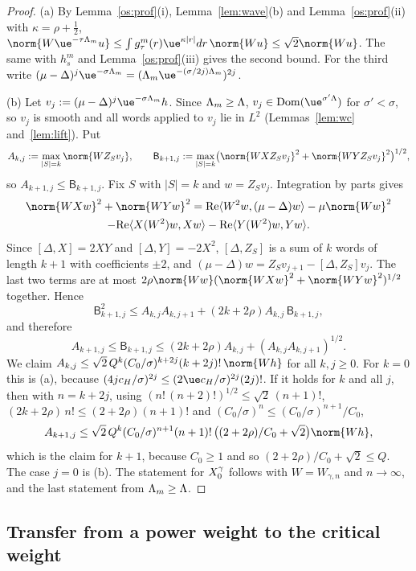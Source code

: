 \begin{proof}
(a) By Lemma~\ref{os:prof}(i), Lemma~\ref{lem:wave}(b) and Lemma~\ref{os:prof}(ii) with $\kappa=\rho+\tfrac12$,
$\norm{W\ue^{-\tau\Lambda_m}u}\le\int g^m_\tau(r)\ue^{\kappa|r|}dr\,\norm{Wu}\le\sqrt2\norm{Wu}$. The same with $h^m_s$ and Lemma~\ref{os:prof}(iii) gives the second
bound. For the third write $(\mu-\Delta)^j\ue^{-\sigma\Lambda_m}=(\Lambda_m\ue^{-(\sigma/2j)\Lambda_m})^{2j}$.

(b) Let $v_j:=(\mu-\Delta)^j\ue^{-\sigma\Lambda_m}h$. Since $\Lambda_m\ge\Lambda$, $v_j\in\operatorname{Dom}(\ue^{\sigma'\osLam})$ for $\sigma'<\sigma$, so $v_j$ is smooth
and all words applied to $v_j$ lie in $L^2$ (Lemmas~\ref{lem:wc} and~\ref{lem:lift}). Put
\[
A_{k,j}:=\max_{|S|=k}\norm{WZ_Sv_j},\qquad\mathsf B_{k+1,j}:=\max_{|S|=k}\bigl(\norm{WXZ_Sv_j}^2+\norm{WYZ_Sv_j}^2\bigr)^{1/2},
\]
so $A_{k+1,j}\le\mathsf B_{k+1,j}$. Fix $S$ with $|S|=k$ and $w=Z_Sv_j$. Integration by parts gives
\begin{multline*}
\norm{WXw}^2+\norm{WYw}^2=\mathrm{Re}\langle W^2w,(\mu-\Delta)w\rangle-\mu\norm{Ww}^2\\
-\mathrm{Re}\langle X(W^2)w,Xw\rangle-\mathrm{Re}\langle Y(W^2)w,Yw\rangle .
\end{multline*}
Since $[\Delta,X]=2XY$ and $[\Delta,Y]=-2X^2$, $[\Delta,Z_S]$ is a sum of $k$ words of length $k+1$ with coefficients $\pm2$, and
$(\mu-\Delta)w=Z_Sv_{j+1}-[\Delta,Z_S]v_j$. The last two terms are at most $2\rho\norm{Ww}(\norm{WXw}^2+\norm{WYw}^2)^{1/2}$ together. Hence
\[
\mathsf B_{k+1,j}^2\le A_{k,j}A_{k,j+1}+(2k+2\rho)A_{k,j}\,\mathsf B_{k+1,j},
\]
and therefore
\[
A_{k+1,j}\le\mathsf B_{k+1,j}\le(2k+2\rho)A_{k,j}+(A_{k,j}A_{k,j+1})^{1/2}.
\]
We claim $A_{k,j}\le\sqrt2\,Q^k(C_0/\sigma)^{k+2j}(k+2j)!\,\norm{Wh}$ for all $k,j\ge0$. For $k=0$ this is (a), because
$(4jc_H/\sigma)^{2j}\le(2\ue c_H/\sigma)^{2j}(2j)!$. If it holds for $k$ and all $j$, then with $n=k+2j$, using $(n!\,(n+2)!)^{1/2}\le\sqrt2\,(n+1)!$,
$(2k+2\rho)\,n!\le(2+2\rho)(n+1)!$ and $(C_0/\sigma)^n\le(C_0/\sigma)^{n+1}/C_0$,
\[
A_{k+1,j}\le\sqrt2\,Q^k(C_0/\sigma)^{n+1}(n+1)!\,\bigl((2+2\rho)/C_0+\sqrt2\bigr)\norm{Wh},
\]
which is the claim for $k+1$, because $C_0\ge1$ and so $(2+2\rho)/C_0+\sqrt2\le Q$. The case $j=0$ is (b). The statement for $X_0^\gamma$ follows with $W=W_{\gamma,n}$ and $n\to\infty$, and the last
statement from $\Lambda_m\ge\Lambda$.
\end{proof}

\subsection{Transfer from a power weight to the critical weight}

